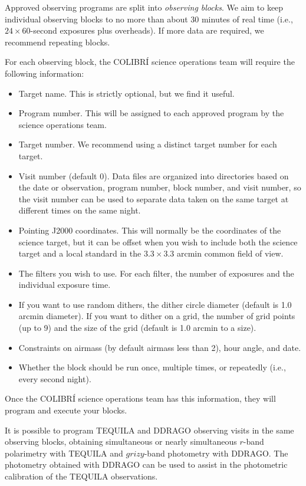 Approved observing programs are split into \emph{observing blocks}. We aim to keep individual observing blocks to no more than about 30 minutes of real time (i.e., $24 \times 60$-second exposures plus overheads). If more data are required, we recommend repeating blocks.

For each observing block, the COLIBRÍ science operations team will require the following information:

\begin{itemize}
    \item Target name. This is strictly optional, but we find it useful.
    \item Program number. This will be assigned to each approved program by the science operations team.
    \item Target number. We recommend using a distinct target number for each target.
    \item Visit number (default 0). Data files are organized into directories based on the date or observation, program number, block number, and visit number, so the visit number can be used to separate data taken on the same target at different times on the same night.
    \item Pointing J2000 coordinates. This will normally be the coordinates of the science target, but it can be offset when you wish to include both the science target and a local standard in the $3.3 \times 3.3$ arcmin common field of view.
    \item The filters you wish to use. For each filter, the number of exposures and the individual exposure time.
    \item If you want to use random dithers, the dither circle diameter (default is 1.0 arcmin diameter). If you want to dither on a grid, the number of grid points (up to 9) and the size of the grid (default is 1.0 arcmin to a size).
    \item Constraints on airmass (by default airmass less than 2), hour angle, and date.
    \item Whether the block should be run once, multiple times, or repeatedly (i.e., every second night).
\end{itemize}

Once the COLIBRÍ science operations team has this information, they will program and execute your blocks.

It is possible to program TEQUILA and DDRAGO observing visits in the same observing blocks, obtaining simultaneous or nearly simultaneous $r$-band polarimetry with TEQUILA and $grizy$-band photometry with DDRAGO. The photometry obtained with DDRAGO can be used to assist in the photometric calibration of the TEQUILA observations.
